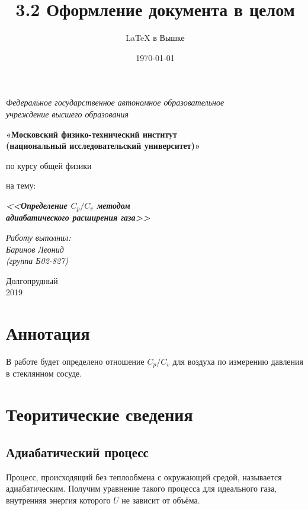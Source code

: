 \documentclass[a4paper,12pt]{article}
\author{\LaTeX{} в Вышке}
\title{3.2 Оформление документа в целом}
\date{\today}
\theoremstyle{plain} %
\theoremstyle{definition} %
\theoremstyle{remark} %
\begin{document}
	\thispagestyle{empty}
	\begin{center}
		\textit{Федеральное государственное автономное образовательное\\ учреждение высшего образования }
		\vspace{0.5ex}
		
		\textbf{«Московский физико-технический институт\\ (национальный исследовательский университет)»}
	\end{center}
	\vspace{10ex}
	\begin{center}
		\vspace{13ex}
		\vspace{1ex}
		
		по курсу общей физики
		
		
		на тему:
		
		\textbf{\textit{<<Определение $C_p/C_v$ методом \\ адиабатического расширения газа>>}}
		\vspace{30ex}
		\begin{flushright}
			\noindent
			\textit{Работу выполнил:}
			\\
			\textit{Баринов Леонид \\(группа Б02-827)}
		\end{flushright}
		\vfill
		Долгопрудный \\2019
	\end{center}
	\newpage
	\setcounter{page}{1}
	\section{Аннотация}
	\fancyhead[R]{\nouppercase{\leftmark}}
	В работе будет определено отношение $C_p/C_v$ для воздуха по измерению давления в стеклянном сосуде.
	\section {Теоритические сведения}
	\subsection{Адиабатический процесс}
	Процесс, происходящий без теплообмена с окружающей средой, называется адиабатическим. Получим уравнение такого процесса для идеального газа, внутренняя энергия которого $U$ не зависит от объёма.
	
\end{document}
